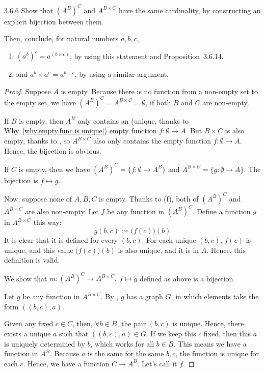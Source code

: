 \begin{exercise}{3.6.6}
	Show that $(A^B)^C$ and $A^{B\times C}$ have the same cardinality, by constructing an explicit bijection between them.
	
	Then, conclude, for natural numbers $a,b,c$,
	\begin{enumerate}
		\item $(a^b)^c = a^{(b\times c)}$, by using this statement and Proposition~3.6.14.
		\item and $a^b \times a^c = a^{b+c}$, by using a similar argument.
	\end{enumerate}
\end{exercise}
\begin{proof}
	Suppose $A$ is empty. Because there is no function from a non-empty set to the empty set, we have $(A^B)^C = A^{B \times C} = \emptyset$, if both $B$ and $C$ are non-empty.
	
	If $B$ is empty, then $A^B$ only contains an (unique, thanks to Why~\ref{why.empty.func.is.unique}) empty function $f: \emptyset \to A$. But $B \times C$ is also empty, thanks to , so $A^{B \times C}$ also only contains the empty function $f: \emptyset \to A$. Hence, the bijection is obvious.
	
	If $C$ is empty, then we have $(A^B)^C = \{f: \emptyset \to A^B\}$ and $A^{B \times C} = \{g: \emptyset \to A\}$. The bijection is $f \mapsto g$.
		
	Now, suppose none of $A,B,C$ is empty. Thanks to  (f), both of $(A^B)^C$ and $A^{B\times C}$ are also non-empty. Let $f$ be any function in $(A^B)^C$. Define a function $g$ in $A^{B \times C}$ this way:
	\[
		g(b,c) := \bigl(f(c)\bigr)(b)
	\]
	It is clear that it is defined for every $(b,c)$. For each unique $(b,c)$, $f(c)$ is unique, and this value $\bigl(f(c)\bigr)(b)$ is also unique, and it is in $A$. Hence, this definition is valid.
	
	
	We show that $m:(A^B)^C \to A^{B \times C},\ f \mapsto g$ defined as above is a bijection.
	
	 Let $g$ be any function in $A^{B \times C}$. By , $g$ has a graph $G$, in which elements take the form $((b,c), a)$. 
	
	Given any fixed $c \in C$, then, $\forall b \in B$, the pair $(b,c)$ is unique. Hence, there exists a unique $a$ such that $((b,c),a) \in G$. If we keep this $c$ fixed, then this $a$ is uniquely determined by $b$, which works for all $b \in B$. This means we have a function in $A^B$. Because $a$ is the same for the same $b,c$, the function is unique for each $c$. Hence, we have a function $C \to A^B$. Let's call it $f$.
	

\end{proof}
